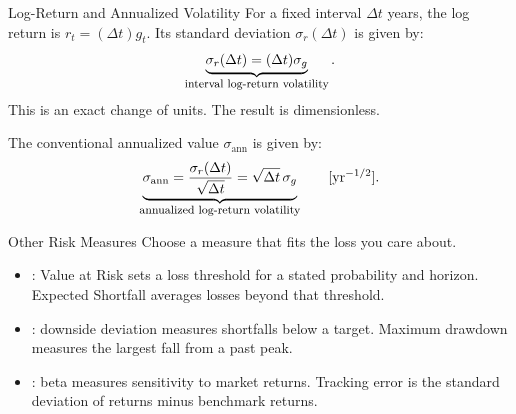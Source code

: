 \documentclass[aspectratio=169,11pt]{beamer}
\begin{document}
\begin{frame}{Log-Return and Annualized Volatility}
  For a fixed interval $\Delta t$ years, the log return is $r_t=(\Delta t)g_t$.
  Its standard deviation $\sigma_r(\Delta t)$ is given by:
  \[
    \underbrace{\sigma_r(\Delta t)=(\Delta t)\sigma_g}_{\text{\footnotesize interval log-return volatility}}.
  \]
  This is an exact change of units. The result is dimensionless.

  The conventional annualized value $\sigma_{\mathrm{ann}}$ is given by:
  \[
    \underbrace{\sigma_{\mathrm{ann}}=
      \frac{\sigma_r(\Delta t)}{\sqrt{\Delta t}}
      =\sqrt{\Delta t}\,\sigma_g}_{\text{\footnotesize annualized log-return volatility}}
    \qquad [\mathrm{yr}^{-1/2}].
  \]

\end{frame}

\begin{frame}{Other Risk Measures}
  Choose a measure that fits the loss you care about.

  \vspace{0.8em}
  \begin{itemize}\setlength{\itemsep}{0.8em}
    \item {}: Value at Risk sets a loss threshold for a
      stated probability and horizon. Expected Shortfall averages losses
      beyond that threshold.
    \item {}: downside deviation measures
      shortfalls below a target. Maximum drawdown measures the largest
      fall from a past peak.
    \item {}: beta measures sensitivity to market returns.
      Tracking error is the standard deviation of returns minus benchmark returns.
  \end{itemize}
\end{frame}
\end{document}

